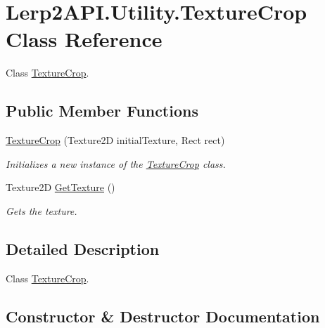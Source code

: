 \hypertarget{class_lerp2_a_p_i_1_1_utility_1_1_texture_crop}{}\section{Lerp2\+A\+P\+I.\+Utility.\+Texture\+Crop Class Reference}
\label{class_lerp2_a_p_i_1_1_utility_1_1_texture_crop}


Class \hyperlink{class_lerp2_a_p_i_1_1_utility_1_1_texture_crop}{Texture\+Crop}.  


\subsection*{Public Member Functions}
\begin{DoxyCompactItemize}
\item 
\hyperlink{class_lerp2_a_p_i_1_1_utility_1_1_texture_crop_a6b02e7b8b9e67259ed172dd506dbeccd}{Texture\+Crop} (Texture2D initial\+Texture, Rect rect)
\begin{DoxyCompactList}\small\item\em Initializes a new instance of the \hyperlink{class_lerp2_a_p_i_1_1_utility_1_1_texture_crop}{Texture\+Crop} class. \end{DoxyCompactList}\item 
Texture2D \hyperlink{class_lerp2_a_p_i_1_1_utility_1_1_texture_crop_a7e6088ab1e6dd67bf128038aa76252c2}{Get\+Texture} ()
\begin{DoxyCompactList}\small\item\em Gets the texture. \end{DoxyCompactList}\end{DoxyCompactItemize}


\subsection{Detailed Description}
Class \hyperlink{class_lerp2_a_p_i_1_1_utility_1_1_texture_crop}{Texture\+Crop}. 



\subsection{Constructor \& Destructor Documentation}
\mbox{\label{class_lerp2_a_p_i_1_1_utility_1_1_texture_crop_a6b02e7b8b9e67259ed172dd506dbeccd}} 
